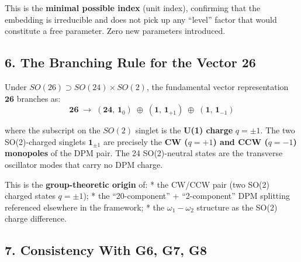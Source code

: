 \documentclass[
]{article}
\begin{document}
This is the \textbf{minimal possible index} (unit index), confirming
that the embedding is irreducible and does not pick up any ``level''
factor that would constitute a free parameter. Zero new parameters
introduced.

\subsection{\texorpdfstring{6. The Branching Rule for the Vector
\(\mathbf{26}\)}{6. The Branching Rule for the Vector \textbackslash mathbf\{26\}}}\label{the-branching-rule-for-the-vector-mathbf26}

Under \(SO(26) \supset SO(24)\times SO(2)\), the fundamental vector
representation \(\mathbf{26}\) branches as:
\[\mathbf{26} \;\longrightarrow\; (\mathbf{24},\,\mathbf{1}_0) \;\oplus\; (\mathbf{1},\,\mathbf{1}_{+1}) \;\oplus\; (\mathbf{1},\,\mathbf{1}_{-1})\]

where the subscript on the \(SO(2)\) singlet is the \textbf{U(1) charge}
\(q = \pm 1\). The two SO(2)-charged singlets \(\mathbf{1}_{\pm1}\) are
precisely the \textbf{CW (\(q=+1\)) and CCW (\(q=-1\)) monopoles} of the
DPM pair. The 24 SO(2)-neutral states are the transverse oscillator
modes that carry no DPM charge.

This is the \textbf{group-theoretic origin} of: * the CW/CCW pair (two
SO(2) charged states \(q=\pm 1\)); * the ``20-component'' +
``2-component'' DPM splitting referenced elsewhere in the framework; *
the \(\omega_1 - \omega_2\) structure as the SO(2) charge difference.

\subsection{7. Consistency With G6, G7,
G8}\label{consistency-with-g6-g7-g8}
\end{document}
